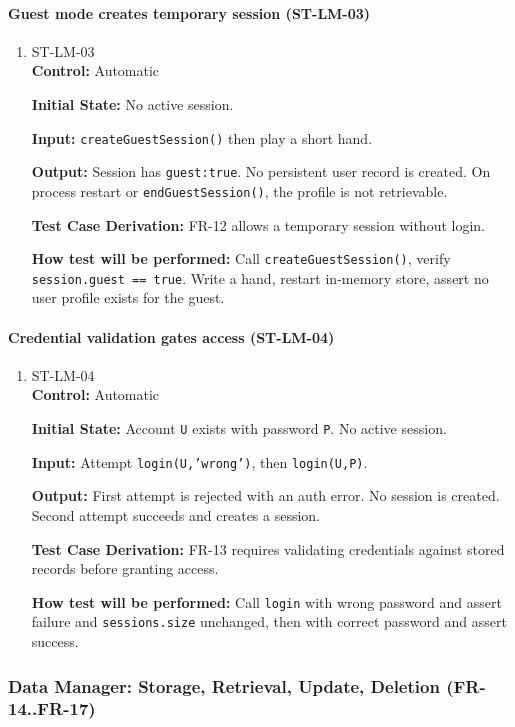 \documentclass[12pt, titlepage]{article}
\begin{document}
\paragraph{Guest mode creates temporary session (ST-LM-03)}
\begin{enumerate}
\item{ST-LM-03\\}
\textbf{Control:} Automatic

\textbf{Initial State:} No active session.

\textbf{Input:} \texttt{createGuestSession()} then play a short hand.

\textbf{Output:} Session has \texttt{guest:true}. No persistent user record is created. On process restart or \texttt{endGuestSession()}, the profile is not retrievable.

\textbf{Test Case Derivation:} FR-12 allows a temporary session without login.

\textbf{How test will be performed:} Call \texttt{createGuestSession()}, verify \texttt{session.guest == true}. Write a hand, restart in-memory store, assert no user profile exists for the guest.
\end{enumerate}

\paragraph{Credential validation gates access (ST-LM-04)}
\begin{enumerate}
\item{ST-LM-04\\}
\textbf{Control:} Automatic

\textbf{Initial State:} Account \texttt{U} exists with password \texttt{P}. No active session.

\textbf{Input:} Attempt \texttt{login(U,'wrong')}, then \texttt{login(U,P)}.

\textbf{Output:} First attempt is rejected with an auth error. No session is created. Second attempt succeeds and creates a session.

\textbf{Test Case Derivation:} FR-13 requires validating credentials against stored records before granting access.

\textbf{How test will be performed:} Call \texttt{login} with wrong password and assert failure and \texttt{sessions.size} unchanged, then with correct password and assert success.
\end{enumerate}

\subsubsection{Data Manager: Storage, Retrieval, Update, Deletion (FR-14..FR-17)}
\end{document}
